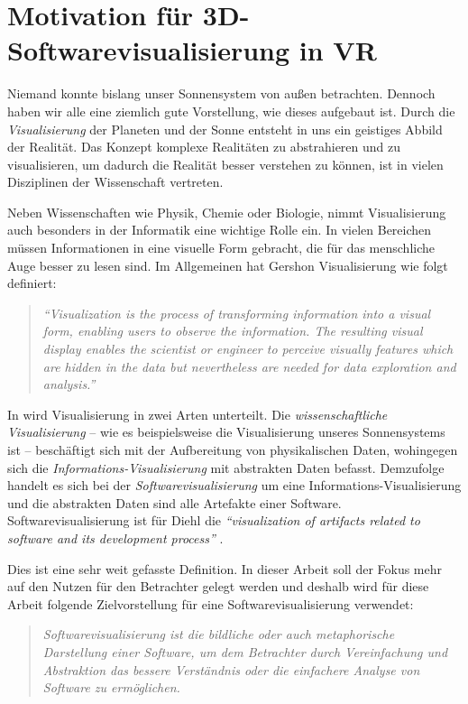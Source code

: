 \section{Motivation für 3D-Softwarevisualisierung in VR}
Niemand konnte bislang unser Sonnensystem von außen betrachten. Dennoch haben wir alle eine ziemlich gute Vorstellung, wie dieses aufgebaut ist. Durch die \textit{Visualisierung} der Planeten und der Sonne entsteht in uns ein geistiges Abbild der Realität. Das Konzept komplexe Realitäten zu abstrahieren und zu visualisieren, um dadurch die Realität besser verstehen zu können, ist in vielen Disziplinen der Wissenschaft vertreten.

Neben Wissenschaften wie Physik, Chemie oder Biologie, nimmt Visualisierung auch besonders in der Informatik eine wichtige Rolle ein. In vielen Bereichen müssen Informationen in eine visuelle Form gebracht, die für das menschliche Auge besser zu lesen sind. Im Allgemeinen hat Gershon Visualisierung wie folgt definiert:

\begin{quotation}
	\textit{"`Visualization is the process of transforming information into a visual form, enabling users to observe the information. The resulting visual display enables the scientist or engineer to perceive visually features which are hidden in the data but nevertheless are needed for data exploration and analysis."'} \cite{gershon1994from}
\end{quotation}

In \cite{diehl2007software} wird Visualisierung in zwei Arten unterteilt. Die \textit{wissenschaftliche Visualisierung} -- wie es beispielsweise die Visualisierung unseres Sonnensystems ist -- beschäftigt sich mit der Aufbereitung von physikalischen Daten, wohingegen sich die \textit{Informations-Visualisierung} mit abstrakten Daten befasst. Demzufolge handelt es sich bei der \textit{Softwarevisualisierung} um eine Informations-Visualisierung und die abstrakten Daten sind alle Artefakte einer Software. Softwarevisualisierung ist für Diehl die \textit{"`visualization of artifacts related to software and its development process"'} \cite{diehl2007software}.

Dies ist eine sehr weit gefasste Definition. In dieser Arbeit soll der Fokus mehr auf den Nutzen für den Betrachter gelegt werden und deshalb wird für diese Arbeit folgende Zielvorstellung für eine Softwarevisualisierung verwendet:

\begin{quotation}
	\textit{Softwarevisualisierung ist die bildliche oder auch metaphorische Darstellung einer Software, um dem Betrachter durch Vereinfachung und Abstraktion das bessere Verständnis oder die einfachere Analyse von Software zu ermöglichen.}
\end{quotation}


